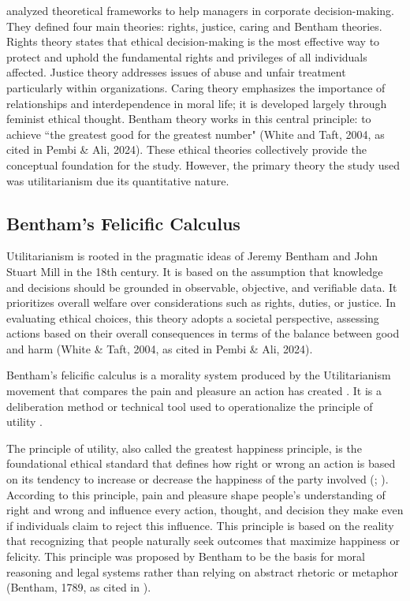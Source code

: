 \documentclass{icsthesis}
\begin{document}
\begin{mainmatter}
\citet{Pembi2024} analyzed theoretical frameworks to help managers in corporate decision-making. They defined four main theories: rights, justice, caring and Bentham theories. Rights theory states that ethical decision-making is the most effective way to protect and uphold the fundamental rights and privileges of all individuals affected. Justice theory addresses issues of abuse and unfair treatment particularly within organizations. Caring theory emphasizes the importance of relationships and interdependence in moral life; it is developed largely through feminist ethical thought. Bentham theory works in this central principle: to achieve “the greatest good for the greatest number" (White and Taft, 2004, as cited in Pembi \& Ali, 2024). These ethical theories collectively provide the conceptual foundation for the study. However, the primary theory the study used was utilitarianism due its quantitative nature. 

			\subsection{Bentham’s Felicific Calculus}
Utilitarianism is rooted in the pragmatic ideas of Jeremy Bentham and John Stuart Mill in the 18th century. It is based on the assumption that knowledge and decisions should be grounded in observable, objective, and verifiable data. It prioritizes overall welfare over considerations such as rights, duties, or justice. In evaluating ethical choices, this theory adopts a societal perspective, assessing actions based on their overall consequences in terms of the balance between good and harm (White \& Taft, 2004, as cited in Pembi \& Ali, 2024).

Bentham’s felicific calculus is a morality system produced by the Utilitarianism movement that compares the pain and pleasure an action has created \citep{Majot2014}. It is a deliberation method or technical tool used to operationalize the principle of utility \citep{Baujard2009}. 

The principle of utility, also called the greatest happiness principle, is the foundational ethical standard that defines how right or wrong an action is based on its tendency to increase or decrease the happiness of the party involved (\citealp{Bentham1907}; \citealp{Baujard2009}). According to this principle, pain and pleasure shape people’s understanding of right and wrong and influence every action, thought, and decision they make even if individuals claim to reject this influence. This principle is based on the reality that recognizing that people naturally seek outcomes that maximize happiness or felicity. This principle was proposed by Bentham to be the basis for moral reasoning and legal systems rather than relying on abstract rhetoric or metaphor (Bentham, 1789, as cited in \citealp{Baujard2009}). 


\end{mainmatter}
\end{document}
